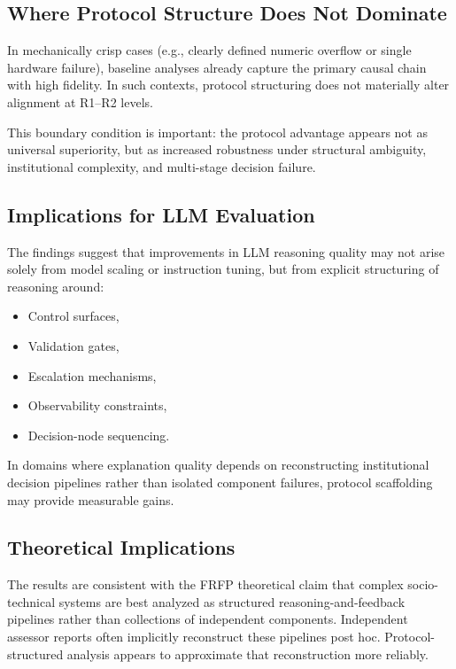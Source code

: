 \subsection{Where Protocol Structure Does Not Dominate}

In mechanically crisp cases (e.g., clearly defined numeric overflow or single hardware failure), baseline analyses already capture the primary causal chain with high fidelity. In such contexts, protocol structuring does not materially alter alignment at R1--R2 levels.

This boundary condition is important: the protocol advantage appears not as universal superiority, but as increased robustness under structural ambiguity, institutional complexity, and multi-stage decision failure.

\subsection{Implications for LLM Evaluation}

The findings suggest that improvements in LLM reasoning quality may not arise solely from model scaling or instruction tuning, but from explicit structuring of reasoning around:

\begin{itemize}
    \item Control surfaces,
    \item Validation gates,
    \item Escalation mechanisms,
    \item Observability constraints,
    \item Decision-node sequencing.
\end{itemize}

In domains where explanation quality depends on reconstructing institutional decision pipelines rather than isolated component failures, protocol scaffolding may provide measurable gains.

\subsection{Theoretical Implications}

The results are consistent with the FRFP theoretical claim that complex socio-technical systems are best analyzed as structured reasoning-and-feedback pipelines rather than collections of independent components. Independent assessor reports often implicitly reconstruct these pipelines post hoc. Protocol-structured analysis appears to approximate that reconstruction more reliably.


